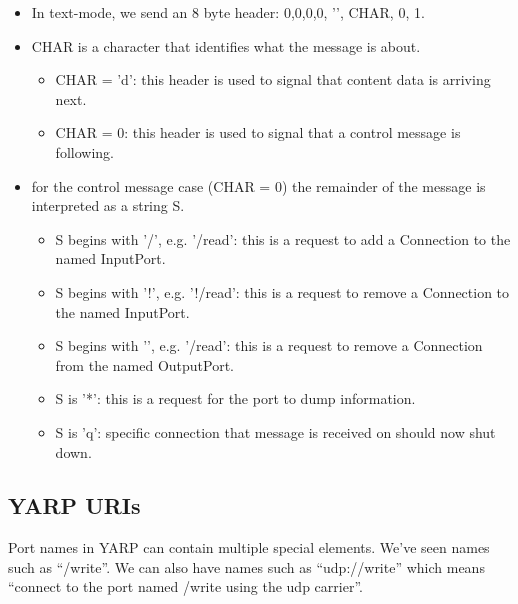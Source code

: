 \documentclass[a4]{article}
\newcommand{\twiddle}{\char126}
\begin{document}
\begin{itemize}

\item In text-mode, we send an 8 byte header: 0,0,0,0, '\twiddle', CHAR, 0, 1.

\item CHAR is a character that identifies what the message is about.

  \begin{itemize}
    
  \item CHAR = 'd': this header is used to signal that content data is
  arriving next.
    
  \item CHAR = 0: this header is used to signal that a control message
  is following.

  \end{itemize}

\item for the control message case (CHAR = 0) the remainder of the message 
  is interpreted as a string S.

  \begin{itemize}
   \item S begins with '/', e.g. '/read': this is a request to add a
   Connection to the named InputPort.

   \item S begins with '!', e.g. '!/read': this is a request to remove
   a Connection to the named InputPort.

   \item S begins with '\twiddle', e.g. '\twiddle/read': this is a request to remove
   a Connection from the named OutputPort.

   \item S is '*': this is a request for the port to dump information.

   \item S is 'q': specific connection that message is received on
   should now shut down.
  \end{itemize}

\end{itemize}




\subsection{YARP URIs}

Port names in YARP can contain multiple special elements.
We've seen names such as ``/write''.  We can also have
names such as ``udp://write'' which means ``connect
to the port named /write using the udp carrier''.
\end{document}
